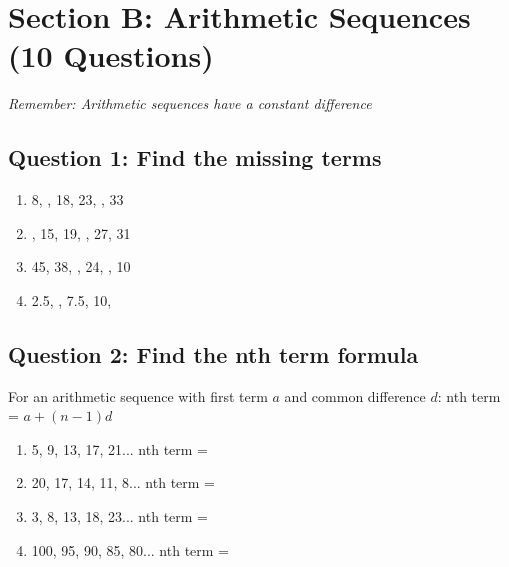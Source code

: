 \documentclass{article}
\begin{document}
\section{Section B: Arithmetic Sequences (10 Questions)}
\textit{Remember: Arithmetic sequences have a constant difference}

\subsection*{Question 1: Find the missing terms}

\begin{enumerate}
    \item 8, \underline{\hspace{1cm}}, 18, 23, \underline{\hspace{1cm}}, 33
    \item \underline{\hspace{1cm}}, 15, 19, \underline{\hspace{1cm}}, 27, 31
    \item 45, 38, \underline{\hspace{1cm}}, 24, \underline{\hspace{1cm}}, 10
    \item 2.5, \underline{\hspace{1cm}}, 7.5, 10, \underline{\hspace{1cm}}
\end{enumerate}

\subsection*{Question 2: Find the nth term formula}

For an arithmetic sequence with first term $a$ and common difference $d$:
nth term = $a + (n-1)d$

\begin{enumerate}
    \item 5, 9, 13, 17, 21... nth term = \underline{\hspace{4cm}}
    \item 20, 17, 14, 11, 8... nth term = \underline{\hspace{4cm}}
    \item 3, 8, 13, 18, 23... nth term = \underline{\hspace{4cm}}
    \item 100, 95, 90, 85, 80... nth term = \underline{\hspace{4cm}}
\end{enumerate}
\end{document}
